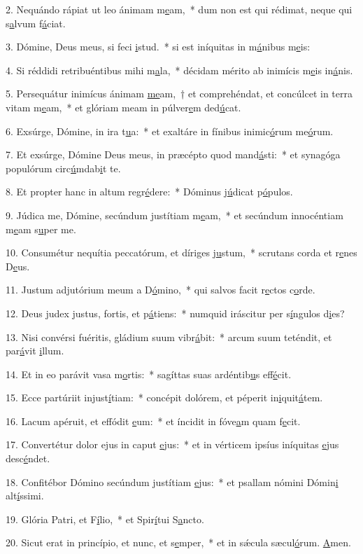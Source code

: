 2. Nequándo rápiat ut leo ánimam m\uline{e}am,~* dum non est qui rédimat, neque qui s\uline{a}lvum f\uline{á}ciat.\par 
3. Dómine, Deus meus, si feci \uline{i}stud.~* si est iníquitas in m\uline{á}nibus m\uline{e}is:\par 
4. Si réddidi retribuéntibus mihi m\uline{a}la,~* décidam mérito ab inimícis m\uline{e}is in\uline{á}nis.\par 
5. Persequátur inimícus ánimam \uline{me}am,~† et comprehéndat, et concúlcet in terra vitam m\uline{e}am,~* et glóriam meam in púlver\uline{e}m ded\uline{ú}cat.\par 
6. Exsúrge, Dómine, in ira t\uline{u}a:~* et exaltáre in fínibus inimic\uline{ó}rum me\uline{ó}rum.\par 
7. Et exsúrge, Dómine Deus meus, in præcépto quod mand\uline{á}sti:~* et synagóga populórum circ\uline{ú}mdab\uline{i}t te.\par 
8. Et propter hanc in altum regr\uline{é}dere:~* Dóminus j\uline{ú}dicat p\uline{ó}pulos.\par 
9. Júdica me, Dómine, secúndum justítiam m\uline{e}am,~* et secúndum innocéntiam m\uline{e}am s\uline{u}per me.\par 
10. Consumétur nequítia peccatórum, et díriges j\uline{u}stum,~* scrutans corda et r\uline{e}nes D\uline{e}us.\par 
11. Justum adjutórium meum a D\uline{ó}mino,~* qui salvos facit r\uline{e}ctos c\uline{o}rde.\par 
12. Deus judex justus, fortis, et p\uline{á}tiens:~* numquid iráscitur per s\uline{í}ngulos d\uline{i}es?\par 
13. Nisi convérsi fuéritis, gládium suum vibr\uline{á}bit:~* arcum suum teténdit, et par\uline{á}vit \uline{i}llum.\par 
14. Et in eo parávit vasa m\uline{o}rtis:~* sagíttas suas ardéntib\uline{u}s eff\uline{é}cit.\par 
15. Ecce partúriit injust\uline{í}tiam:~* concépit dolórem, et péperit in\uline{i}quit\uline{á}tem.\par 
16. Lacum apéruit, et effódit \uline{e}um:~* et íncidit in fóve\uline{a}m quam f\uline{e}cit.\par 
17. Convertétur dolor ejus in caput \uline{e}jus:~* et in vérticem ipsíus iníquitas \uline{e}jus desc\uline{é}ndet.\par 
18. Confitébor Dómino secúndum justítiam \uline{e}jus:~* et psallam nómini Dómin\uline{i} alt\uline{í}ssimi.\par 
19. Glória Patri, et F\uline{í}lio,~* et Spir\uline{í}tui S\uline{a}ncto.\par 
20. Sicut erat in princípio, et nunc, et s\uline{e}mper,~* et in sǽcula sæcul\uline{ó}rum. \uline{A}men.\par 
